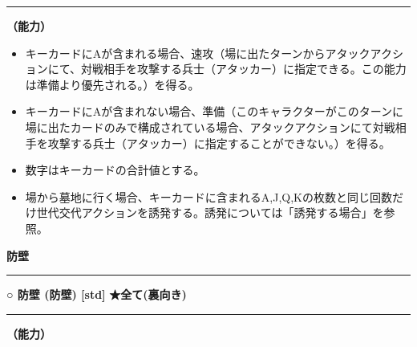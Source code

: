 \documentclass[twocolumn,a5paper,papersize,10pt]{jarticle}
\begin{document}
\vspace{1mm}%
\hrule height 0.1mm depth 0mm width 66.5mm %
\vspace{1mm}%

{\bf（能力）}


\vspace{-1zh}%
\begin{itemize}
\setlength{\leftskip}{-0.3cm}
\setlength{\parskip}{0pt} %

\item キーカードにAが含まれる場合、速攻（場に出たターンからアタックアクションにて、対戦相手を攻撃する兵士（アタッカー）に指定できる。この能力は準備より優先される。）を得る。

\item キーカードにAが含まれない場合、準備（このキャラクターがこのターンに場に出たカードのみで構成されている場合、アタックアクションにて対戦相手を攻撃する兵士（アタッカー）に指定することができない。）を得る。

\item 数字はキーカードの合計値とする。

\item 場から墓地に行く場合、キーカードに含まれるA,J,Q,Kの枚数と同じ回数だけ世代交代アクションを誘発する。誘発については「誘発する場合」を参照。
\vspace{-1zh}%
\end{itemize}


\begin{tcolorbox}
{\scriptsize\bf 防壁}
\end{tcolorbox}
\vspace{-1zh}%
\vspace{2mm} %
\hrule height 0.5mm depth 0mm width 66.5mm %
\vspace{1mm} %
{\small\bf ○ 防壁 {\scriptsize (防壁) [std]}} %
\hfill 
{\footnotesize\bf ★全て(裏向き) }

\vspace{1mm}%
\hrule height 0.1mm depth 0mm width 66.5mm %
\vspace{1mm}%

{\bf（能力）}
\end{document}
